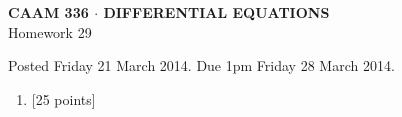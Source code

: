 \documentclass[10pt]{article}
\begin{document}
\vspace*{-5em}
\begin{center}
\large \textsf{\textbf{CAAM 336 $\cdot$ DIFFERENTIAL EQUATIONS}\\[0.5em]
Homework 29 }
\end{center}

Posted Friday 21 March 2014.  Due 1pm Friday 28 March 2014.

\begin{enumerate}\addtocounter{enumi}{28}
\item {[25 points]}  
\end{enumerate}
\end{document}
